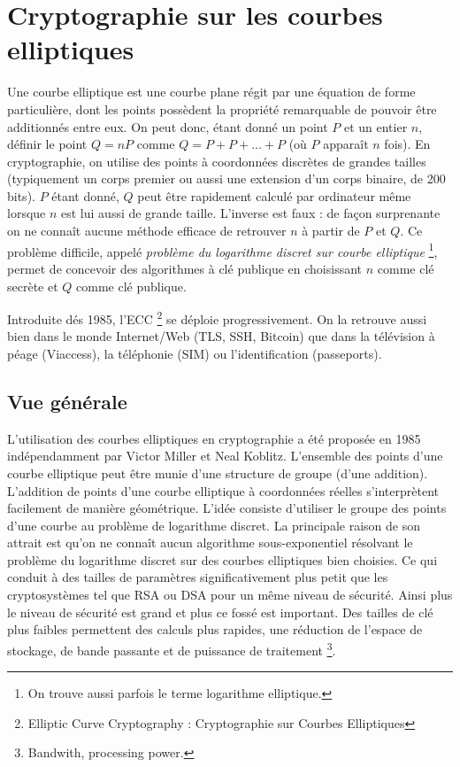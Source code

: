 
\chapter{Cryptographie sur les courbes elliptiques}
Une courbe elliptique est une courbe plane régit par une équation de forme particulière, dont les points possèdent la propriété remarquable de pouvoir être additionnés entre eux. On peut donc, étant donné un point $P$ et un entier $n$, définir le point $Q = nP$ comme $Q = P + P + \ldots + P$ (où $P$ apparaît $n$ fois). En cryptographie, on utilise des points à coordonnées discrètes de grandes tailles (typiquement un corps premier ou aussi une extension d'un corps binaire, de 200 bits). $P$ étant donné, $Q$ peut être rapidement calculé par ordinateur même lorsque $n$ est lui aussi de grande taille. L'inverse est faux : de façon surprenante on ne connaît aucune méthode efficace de retrouver $n$ à partir de $P$ et $Q$. Ce problème difficile, appelé \emph{problème du logarithme discret sur courbe elliptique} \footnote{On trouve aussi parfois le terme logarithme elliptique.}, permet de concevoir des algorithmes à clé publique en choisissant $n$ comme clé secrète et $Q$ comme clé publique.

Introduite dés 1985, l'ECC \footnote{Elliptic Curve Cryptography : Cryptographie sur Courbes Elliptiques} se déploie progressivement. On la retrouve aussi bien dans le monde Internet/Web (TLS, SSH, Bitcoin) que dans la télévision à péage (Viaccess), la téléphonie (SIM) ou l'identification (passeports).


\section{Vue générale}
L'utilisation des courbes elliptiques en cryptographie a été proposée en 1985 indépendamment par Victor Miller et Neal Koblitz. L'ensemble des points d'une courbe elliptique peut être munie d'une structure de groupe (d'une addition). L'addition de points d'une courbe elliptique à coordonnées réelles s'interprètent facilement de manière géométrique. L'idée consiste d'utiliser le groupe des points d'une courbe au problème de logarithme discret. La principale raison de son attrait est qu'on ne connaît aucun algorithme sous-exponentiel résolvant le problème du logarithme discret sur des courbes elliptiques bien choisies. Ce qui conduit à des tailles de paramètres significativement plus petit que les cryptosystèmes tel que RSA ou DSA pour un même niveau de sécurité. Ainsi plus le niveau de sécurité est grand et plus ce fossé est important. Des tailles de clé plus faibles permettent des calculs plus rapides, une réduction de l'espace de stockage, de bande passante et de puissance de traitement \footnote{Bandwith, processing power.}.

